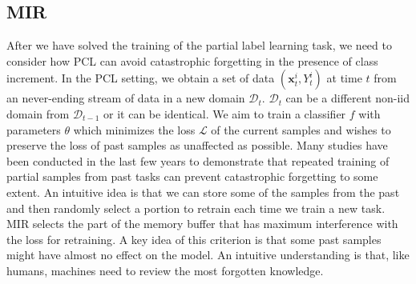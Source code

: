 \documentclass{article} %
\begin{document}
\subsection{MIR}
After we have solved the training of the partial label learning task, we need to consider how PCL can avoid catastrophic forgetting in the presence of class increment.
In the PCL setting, we obtain a set of data $(\boldsymbol{x}_t^i, Y_t^i)$ at time $t$ from an never-ending stream of data in a new domain $\mathcal{D}_t$. 
$\mathcal{D}_t$ can be a different non-iid domain from $\mathcal{D}_{t-1}$ or it can be identical. 
We aim to train a classifier $f$ with parameters $\theta$ which minimizes the loss $\mathcal{L}$ of the current samples and wishes to preserve the loss of past samples as unaffected as possible. 
Many studies have been conducted in the last few years to demonstrate that repeated training of partial samples from past tasks can prevent catastrophic forgetting to some extent\citep{ArslanChaudhry2019OnTE,RahafAljundi2019GradientBS,DavidLopezPaz2017GradientEM, ArslanChaudhry2019ContinualLW}.
An intuitive idea is that we can store some of the samples from the past and then randomly select a portion to retrain each time we train a new task. MIR selects the part of the memory buffer that has maximum interference with the loss for retraining\citep{RahafAljundi2019GradientBS}. 
A key idea of this criterion is that some past samples might have almost no effect on the model.
An intuitive understanding is that, like humans, machines need to review the most forgotten knowledge.
\end{document}
